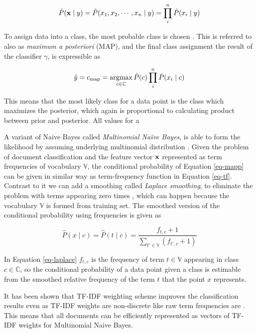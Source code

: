 \begin{equation}
    \hat{P}(\mathbf{x} \mid y) = \hat{P}(x_1, x_2, \cdots, x_n \mid y) = \prod \limits_i^n \hat{P}(x_i \mid y)
\end{equation}

To assign data into a class, the most probable class is chosen \cite{Zhang04theoptimality, acemNBtc2001, Manning:2008:IIR:1394399}. This is referred to also as \emph{maximum a posteriori} (MAP), and the final class assignment \ie the result of the classifier $\gamma$, is expressible as

\begin{equation} \label{eq-mapp}
    \hat{y} = c_{\text{map}} = \operatorname*{argmax} \limits_{c \in \mathbb{C}} \hat{P}(c) \prod \limits_i^n \hat{P}(x_i \mid c)
\end{equation}

\noindent
This means that the most likely class for a data point is the class which maximizes the posterior, which again is proportional to calculating product between prior and posterior. All values for a 

A variant of Naive Bayes called \emph{Multinomial Naïve Bayes}, is able to form the likelihood by assuming underlying multinomial distribution \cite{acemNBtc2001}. Given the problem of document classification and the feature vector $\mathbf{x}$ represented as term frequencies of vocabulary $\mathbb{V}$, the conditional probability of Equation \ref{eq-mapp} can be given in similar way as term-frequency function in Equation \ref{eq-tf}. Contrast to it we can add a smoothing called \emph{Laplace smoothing}, to eliminate the problem with terms appearing zero times \cite{Manning:2008:IIR:1394399}, which can happen because the vocabulary $\mathbb{V}$ is formed from training set. The smoothed version of the conditional probability using frequencies is given as

\begin{equation} \label{eq-laplace}
    \hat{P}(x \mid c) = \hat{P}(t \mid c) = \dfrac{f_{t, c} + 1}{\sum \limits_{t' \in \mathbb{V}} (f_{t', c} + 1)} 
\end{equation}

\noindent
In Equation \ref{eq-laplace} $f_{t, c}$ is the frequency of term $t \in \mathbb{V}$ appearing in class $c \in \mathbb{C}$, so the conditional probability of a data point given a class is estimable from the smoothed relative frequency of the term $t$ that the point $x$ represents. 

It has been shown that TF-IDF weighting scheme improves the classification results even as TF-IDF weights are non-discrete like raw term frequencies are \cite{Kibriya:2004:MNB:2146834.2146882}. This means that all documents can be efficiently represented as vectors of TF-IDF weights for Multinomial Naive Bayes.


